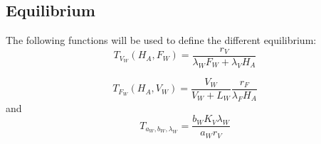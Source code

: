 \documentclass{article}
\newcommand{\lfw}{\lambda_{F}}
\newcommand{\lvw}{\lambda_{V}}
\newcommand{\lfv}{\lambda_{W}}
\begin{document}
\subsection{Equilibrium}


The following functions will be used to define the different equilibrium:
\begin{equation}
T_{V_W}(H_A, F_W) = \dfrac{r_V}{\lfv F_W + \lvw H_A}
\end{equation}

\begin{equation}
T_{F_W}(H_A, V_W) = \dfrac{V_W}{V_W + L_W} \dfrac{r_F}{ \lfw H_A}
\end{equation}
and
\begin{equation}
T_{a_W, b_W,\lfv} = \dfrac{b_W K_V \lfv}{a_W r_V} 
\end{equation}
\end{document}
